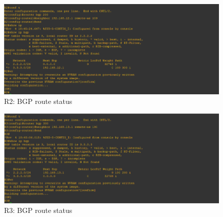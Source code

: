 \documentclass[paper=letter, fontsize=12pt]{article}
\begin{document}
\begin{figure}[H]
	\setlength{\parindent}{-5em}
	\includegraphics[width=550px]{assets/r2bgp}
	\caption{R2: BGP route status}
\end{figure}

\begin{figure}[H]
	\setlength{\parindent}{-5em}
	\includegraphics[width=550px]{assets/r3bgp}
	\caption{R3: BGP route status}
\end{figure}
\end{document}
